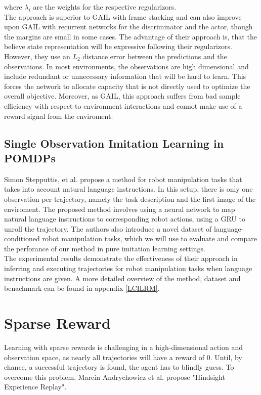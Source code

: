where $\lambda_i$ are the weights for the respective regularizors. \\
The approach is superior to GAIL with frame stacking and can also improve upon GAIL with recurrent networks for the discriminator and the actor, though the margins are small in some cases. The advantage 
of their approach is, that the believe state representation will be expressive following their regularizors. However, they use an $L_2$ distance error between the predictions and the observations. In most environments, 
the observations are high dimensional and include redundant or unnecessary information that will be hard to learn. This forces the network to allocate capacity that is not directly used to 
optimize the overall objective. Moreover, as GAIL, this approach suffers from bad sample efficiency with respect to environment interactions and connot make use of a reward signal from the enviroment. 

\subsection{Single Observation Imitation Learning in POMDPs}
Simon Stepputtis, et al. \cite{stepputtis2020languageconditioned} propose a method for robot manipulation tasks that takes 
into account natural language instructions. 
In this setup, there is only one observation per trajectory, namely the task description and the first image of the enviroment.
The proposed method involves using a neural network to map natural language instructions to 
corresponding robot actions, using a GRU to unroll the trajectory. The authors also introduce a novel dataset of language-conditioned robot manipulation tasks, which we will use to evaluate 
and compare the perforance of our method in pure imitation learning settings.\\ 
The experimental results demonstrate the effectiveness of their approach in inferring and executing trajectories for robot manipulation 
tasks when language instructions are given. A more detailed overview of the method, dataset and benachmark can be found in appendix \ref{LCILRM}.\\

\section{Sparse Reward}
\label{sec:HER}
Learning with sparse rewards is challenging in a high-dimensional action and observation space, as nearly all trajectories will have a reward of 0.
Until, by chance, a successful trajectory is found, the agent has to blindly guess. To overcome this problem, Marcin Andrychowicz et al. \cite{andrychowicz2018hindsight} 
propose "Hindsight Experience Replay".\\

